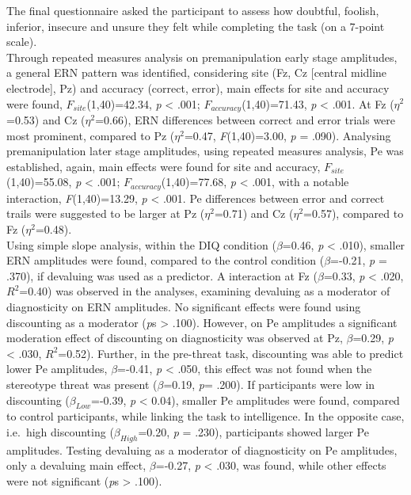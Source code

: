 \documentclass[
  stu,floatsintext]{apa7}
\begin{document}
The final questionnaire asked the participant to assess how doubtful, foolish, inferior, insecure and unsure they felt while completing the task (on a 7-point scale).\\
Through repeated measures analysis on premanipulation early stage amplitudes, a general ERN pattern was identified, considering site (Fz, Cz {[}central midline electrode{]}, Pz) and accuracy (correct, error), main effects for site and accuracy were found, \(F_{site}\)(1,40)=42.34, \emph{p} \textless{} .001; \(F_{accuracy}\)(1,40)=71.43, \emph{p} \textless{} .001.
At Fz (\(\eta^{2}\)=0.53) and Cz (\(\eta^{2}\)=0.66), ERN differences between correct and error trials were most prominent, compared to Pz (\(\eta^{2}\)=0.47, \emph{F}(1,40)=3.00, \emph{p} = .090).
Analysing premanipulation later stage amplitudes, using repeated measures analysis, Pe was established, again, main effects were found for site and accuracy, \(F_{site}\)(1,40)=55.08, \emph{p} \textless{} .001; \(F_{accuracy}\)(1,40)=77.68, \emph{p} \textless{} .001, with a notable interaction, \emph{F}(1,40)=13.29, \emph{p} \textless{} .001.
Pe differences between error and correct trails were suggested to be larger at Pz (\(\eta^{2}\)=0.71) and Cz (\(\eta^{2}\)=0.57), compared to Fz (\(\eta^{2}\)=0.48).\\
Using simple slope analysis, within the DIQ condition (\(\beta\)=0.46, \emph{p} \textless{} .010), smaller ERN amplitudes were found, compared to the control condition (\(\beta\)=-0.21, \emph{p} = .370), if devaluing was used as a predictor.
A interaction at Fz (\(\beta\)=0.33, \emph{p} \textless{} .020, \(R^2\)=0.40) was observed in the analyses, examining devaluing as a moderator of diagnosticity on ERN amplitudes.
No significant effects were found using discounting as a moderator (\emph{p}s \textgreater{} .100).
However, on Pe amplitudes a significant moderation effect of discounting on diagnosticity was observed at Pz, \(\beta\)=0.29, \emph{p} \textless{} .030, \(R^2\)=0.52).
Further, in the pre-threat task, discounting was able to predict lower Pe amplitudes, \(\beta\)=-0.41, \emph{p} \textless{} .050, this effect was not found when the stereotype threat was present (\(\beta\)=0.19, \emph{p}= .200).
If participants were low in discounting (\(\beta_{Low}\)=-0.39, \emph{p} \textless{} 0.04), smaller Pe amplitudes were found, compared to control participants, while linking the task to intelligence.
In the opposite case, i.e.~high discounting (\(\beta_{High}\)=0.20, \emph{p} = .230), participants showed larger Pe amplitudes.
Testing devaluing as a moderator of diagnosticity on Pe amplitudes, only a devaluing main effect, \(\beta\)=-0.27, \emph{p} \textless{} .030, was found, while other effects were not significant (\emph{p}s \textgreater{} .100).\\
\end{document}
